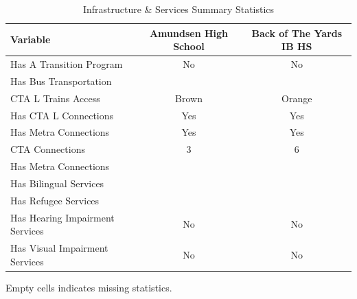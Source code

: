 \begin{table}[H]
\renewcommand{\arraystretch}{1.5}
\caption*{
{\large Infrastructure \& Services Summary Statistics}
} 

\fontsize{10pt}{11pt}\selectfont

\begin{tabular*}{\linewidth}{@{\extracolsep{\fill}}lcc}
\toprule
Variable & Amundsen High School & Back of The Yards IB HS \\ 
\midrule\addlinespace[2.5pt]
Has A Transition Program & No & No \\
Has Bus Transportation &  &  \\
CTA L Trains Access & Brown & Orange \\
Has CTA L Connections & Yes & Yes \\
Has Metra Connections & Yes & Yes \\
CTA Connections & 3 & 6 \\
Has Metra Connections &  &  \\
Has Bilingual Services &  &  \\
Has Refugee Services &  &  \\
Has Hearing Impairment Services & No & No \\
Has Visual Impairment Services & No & No \\
\bottomrule
\end{tabular*}
\begin{minipage}{\linewidth}
Empty cells indicates missing statistics.\\
\end{minipage}
\end{table}
